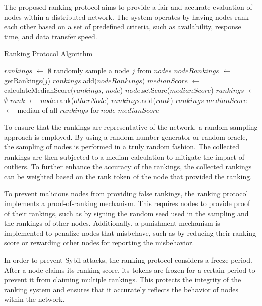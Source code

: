 \documentclass[twocolumn]{article}
\begin{document}
The proposed ranking protocol aims to provide a fair and accurate evaluation of nodes within a distributed network. The system operates by having nodes rank each other based on a set of predefined criteria, such as availability, response time, and data transfer speed.


\begin{algorithm}[h]
\caption{Ranking Protocol Algorithm}
\label{alg:ranking-protocol}
\begin{algorithmic}[1]
\State $rankings$ $\gets$ $\emptyset$
    \State randomly sample a node $j$ from $nodes$
    \State $nodeRankings$ $\gets$ getRankings($j$)
    \State $rankings$.add($nodeRankings$)
\EndFor
{}
    \State $medianScore$ $\gets$ calculateMedianScore($rankings$, $node$)
    \State $node$.setScore($medianScore$)
\EndFor
\EndProcedure
{}
\State $rankings$ $\gets$ $\emptyset$
    \State $rank$ $\gets$ $node$.rank($otherNode$)
    \State $rankings$.add($rank$)
\EndFor
\State \Return $rankings$
\EndProcedure
{}
\State $medianScore$ $\gets$ median of all $rankings$ for $node$
\State \Return $medianScore$
\EndProcedure
\end{algorithmic}
\end{algorithm}

To ensure that the rankings are representative of the network, a random sampling approach is employed. By using a random number generator or random oracle, the sampling of nodes is performed in a truly random fashion. The collected rankings are then subjected to a median calculation to mitigate the impact of outliers. To further enhance the accuracy of the rankings, the collected rankings can be weighted based on the rank token of the node that provided the ranking.

To prevent malicious nodes from providing false rankings, the ranking protocol implements a proof-of-ranking mechanism. This requires nodes to provide proof of their rankings, such as by signing the random seed used in the sampling and the rankings of other nodes. Additionally, a punishment mechanism is implemented to penalize nodes that misbehave, such as by reducing their ranking score or rewarding other nodes for reporting the misbehavior.

In order to prevent Sybil attacks, the ranking protocol considers a freeze period. After a node claims its ranking score, its tokens are frozen for a certain period to prevent it from claiming multiple rankings. This protects the integrity of the ranking system and ensures that it accurately reflects the behavior of nodes within the network.
\end{document}
